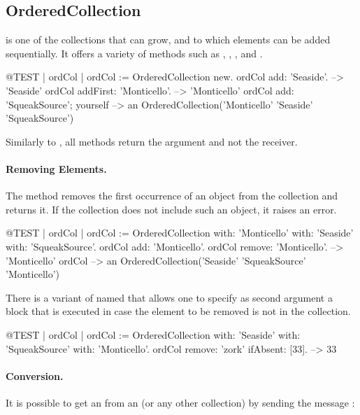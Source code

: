 \documentclass[a4paper,10pt,twoside]{book}
\begin{document}
\subsection{OrderedCollection}
 is one of the collections that can grow, and to which elements can be added sequentially.
It offers a variety of methods such as , , , and .

\begin{code}{@TEST | ordCol |}
ordCol := OrderedCollection new.
ordCol add: 'Seaside'. --> 'Seaside'
ordCol addFirst: 'Monticello'. --> 'Monticello'
ordCol add: 'SqueakSource'; yourself --> an OrderedCollection('Monticello' 'Seaside' 'SqueakSource')
\end{code}
\noindent

Similarly to , all  methods return the argument and not the receiver.

\paragraph{Removing Elements.}
The method   removes the first occurrence of an object from the collection and returns it.
If the collection does not include such an object, it raises an error.

\begin{code}{@TEST | ordCol | ordCol := OrderedCollection with: 'Monticello' with: 'Seaside' with: 'SqueakSource'.}
ordCol add: 'Monticello'.
ordCol remove: 'Monticello'. --> 'Monticello'
ordCol --> an OrderedCollection('Seaside' 'SqueakSource' 'Monticello')
\end{code}

There is a variant of  named  that allows one to specify as second argument a block that is executed in case the element to be removed is not in the collection.

\begin{code}{@TEST | ordCol | ordCol := OrderedCollection with: 'Seaside' with: 'SqueakSource' with: 'Monticello'.}
ordCol remove: 'zork' ifAbsent: [33]. --> 33
\end{code}

\paragraph{Conversion.}
It is possible to get an  from an  (or any other collection) by sending the message :
\end{document}
